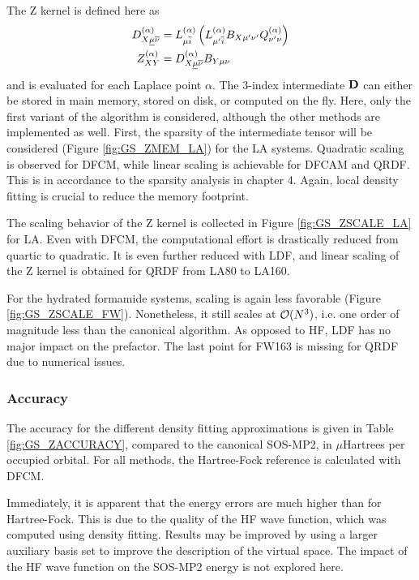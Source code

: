 The Z kernel is defined here as
\begin{align}
D^{(\alpha)}_{X\underline{\mu}\overline{\nu}} &= L^{(\alpha)}_{\mu\overline{i}} \left( L^{(\alpha)}_{\mu' \overline{i}} B_{X\mu'\nu'}  Q^{(\alpha)}_{\nu'\nu} \right) \\
Z_{XY}^{(\alpha)} &= D^{(\alpha)}_{X\underline{\mu}\overline{\nu}} B_{Y\mu\nu}
\end{align}
\noindent and is evaluated for each Laplace point $\alpha$. The 3-index intermediate $\mathbf{D}$ can either be stored in main memory, stored on disk, or computed on the fly. Here, only the first variant of the algorithm is considered, although the other methods are implemented as well. First, the sparsity of the intermediate tensor will be considered (Figure \ref{fig:GS_ZMEM_LA}) for the LA systems. Quadratic scaling is observed for DFCM, while linear scaling is achievable for DFCAM and QRDF. This is in accordance to the sparsity analysis in chapter 4. Again, local density fitting is crucial to reduce the memory footprint.



The scaling behavior of the Z kernel is collected in Figure \ref{fig:GS_ZSCALE_LA} for LA. Even with DFCM, the computational effort is drastically reduced from quartic to quadratic. It is even further reduced with LDF, and linear scaling of the Z kernel is obtained for QRDF from LA80 to LA160. 

For the hydrated formamide systems, scaling is again less favorable (Figure \ref{fig:GS_ZSCALE_FW}). Nonetheless, it still scales at $\mathcal{O}(N^{3})$, i.e. one order of magnitude less than the canonical algorithm. As opposed to HF, LDF has no major impact on the prefactor. The last point for FW163 is missing for QRDF due to numerical issues.  

\subsubsection{Accuracy}

The accuracy for the different density fitting approximations is given in Table \ref{fig:GS_ZACCURACY}, compared to the canonical SOS-MP2, in $\mu$Hartrees per occupied orbital. For all methods, the Hartree-Fock reference is calculated with DFCM.

Immediately, it is apparent that the energy errors are much higher than for Hartree-Fock. This is due to the quality of the HF wave function, which was computed using density fitting. Results may be improved by using a larger auxiliary basis set to improve the description of the virtual space. The impact of the HF wave function on the SOS-MP2 energy is not explored here.

